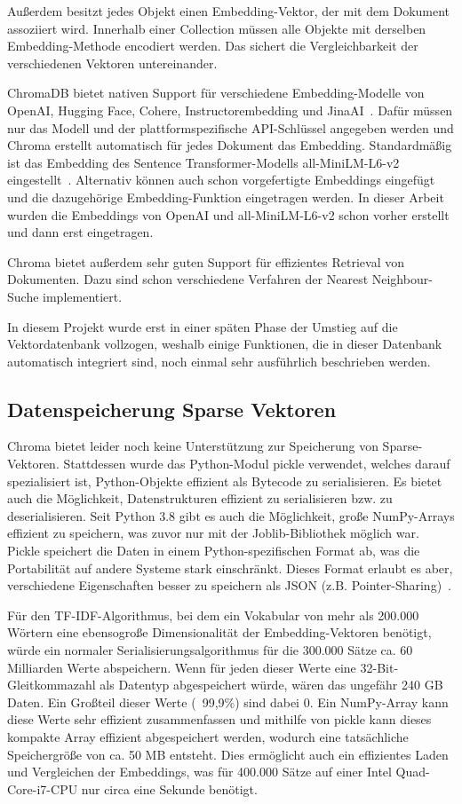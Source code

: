 Außerdem besitzt jedes Objekt einen Embedding-Vektor, der mit dem Dokument assoziiert wird.
Innerhalb einer Collection müssen alle Objekte mit derselben Embedding-Methode encodiert werden.
Das sichert die Vergleichbarkeit der verschiedenen Vektoren untereinander.

ChromaDB bietet nativen Support für verschiedene Embedding-Modelle von OpenAI, Hugging Face, Cohere, Instructorembedding und JinaAI~\cite{chroma}.
Dafür müssen nur das Modell und der plattformspezifische API-Schlüssel angegeben werden und Chroma erstellt automatisch für jedes Dokument das Embedding.
Standardmäßig ist das Embedding des Sentence Transformer-Modells all-MiniLM-L6-v2 eingestellt~\cite{chroma}.
Alternativ können auch schon vorgefertigte Embeddings eingefügt und die dazugehörige Embedding-Funktion eingetragen werden.
In dieser Arbeit wurden die Embeddings von OpenAI und all-MiniLM-L6-v2 schon vorher erstellt und dann erst eingetragen.

Chroma bietet außerdem sehr guten Support für effizientes Retrieval von Dokumenten.
Dazu sind schon verschiedene Verfahren der Nearest Neighbour-Suche implementiert.

In diesem Projekt wurde erst in einer späten Phase der Umstieg auf die Vektordatenbank vollzogen, weshalb einige Funktionen, die in dieser Datenbank automatisch integriert sind, noch einmal sehr ausführlich beschrieben werden.

\subsection{Datenspeicherung Sparse Vektoren}

Chroma bietet leider noch keine Unterstützung zur Speicherung von Sparse-Vektoren.
Stattdessen wurde das Python-Modul pickle verwendet, welches darauf spezialisiert ist, Python-Objekte effizient als Bytecode zu serialisieren.
Es bietet auch die Möglichkeit, Datenstrukturen effizient zu serialisieren bzw. zu deserialisieren.
Seit Python 3.8 gibt es auch die Möglichkeit, große NumPy-Arrays effizient zu speichern, was zuvor nur mit der Joblib-Bibliothek möglich war.
Pickle speichert die Daten in einem Python-spezifischen Format ab, was die Portabilität auf andere Systeme stark einschränkt.
Dieses Format erlaubt es aber, verschiedene Eigenschaften besser zu speichern als JSON (z.B. Pointer-Sharing)~\cite{pickle}.

Für den TF-IDF-Algorithmus, bei dem ein Vokabular von mehr als 200.000 Wörtern eine ebensogroße Dimensionalität der Embedding-Vektoren benötigt, würde ein normaler Serialisierungsalgorithmus für die 300.000 Sätze ca. 60 Milliarden Werte abspeichern.
Wenn für jeden dieser Werte eine 32-Bit-Gleitkommazahl als Datentyp abgespeichert würde, wären das ungefähr 240 GB Daten.
Ein Großteil dieser Werte (~99,9\%) sind dabei 0.
Ein NumPy-Array kann diese Werte sehr effizient zusammenfassen und mithilfe von pickle kann dieses kompakte Array effizient abgespeichert werden, wodurch eine tatsächliche Speichergröße von ca. 50 MB entsteht.
Dies ermöglicht auch ein effizientes Laden und Vergleichen der Embeddings, was für 400.000 Sätze auf einer Intel Quad-Core-i7-CPU nur circa eine Sekunde benötigt.